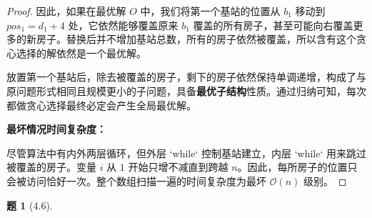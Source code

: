 \documentclass[11pt, a4paper]{article}
\newtheorem{problem}{题}
\begin{document}
\begin{proof}
    因此，如果在最优解 $O$ 中，我们将第一个基站的位置从 $b_1$ 移动到 $pos_1 = d_1 + 4$ 处，它依然能够覆盖原来 $b_1$ 覆盖的所有房子，甚至可能向右覆盖更多的新房子。替换后并不增加基站总数，所有的房子依然被覆盖，所以含有这个贪心选择的解依然是一个最优解。
    
    放置第一个基站后，除去被覆盖的房子，剩下的房子依然保持单调递增，构成了与原问题形式相同且规模更小的子问题，具备\textbf{最优子结构}性质。通过归纳可知，每次都做贪心选择最终必定会产生全局最优解。

    \textbf{最坏情况时间复杂度：}
    
    尽管算法中有内外两层循环，但外层 `while` 控制基站建立，内层 `while` 用来跳过被覆盖的房子。变量 $i$ 从 $1$ 开始只增不减直到跨越 $n$。因此，每所房子的位置只会被访问恰好一次。整个数组扫描一遍的时间复杂度为最坏 $\mathcal{O}(n)$ 级别。
\end{proof}

\begin{problem}[4.6]
\end{problem}
\end{document}
